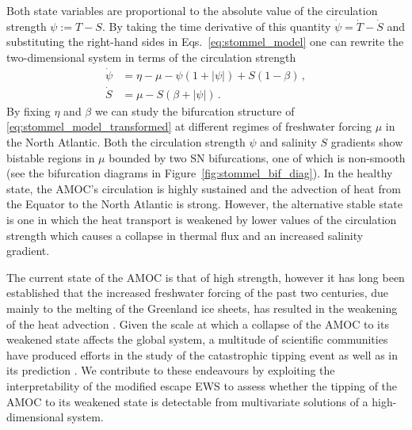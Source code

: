 \documentclass[a4paper,fleqn]{cas-sc}
\newcommand{\fref}[1]{Figure~\ref{#1}}
\begin{document}
Both state variables are proportional to the absolute value of the circulation strength $\psi:=T-S$.
By taking the time derivative of this quantity $\dot{\psi} = \dot{T} - \dot{S}$ and substituting the right-hand sides in Eqs.~\eqref{eq:stommel_model} one can rewrite the two-dimensional system in terms of the circulation strength
%
\begin{equation}
         \begin{aligned}\label{eq:stommel_model_transformed}
                \dot{\psi} &= \eta - \mu -\psi(1+|\psi|) + S(1-\beta)\,,\\
                \dot{S} &= \mu - S(\beta + |\psi|)\,.
        \end{aligned}
\end{equation}
%
By fixing $\eta$ and $\beta$ we can study the bifurcation structure of \eqref{eq:stommel_model_transformed} at different regimes of freshwater forcing $\mu$ in the North Atlantic.
Both the circulation strength $\psi$ and salinity $S$ gradients show bistable regions in $\mu$ bounded by two SN bifurcations, one of which is non-smooth \cite{Budd2024} (see the bifurcation diagrams in \fref{fig:stommel_bif_diag}).
In the healthy state, the AMOC's circulation is highly sustained and the advection of heat from the Equator to the North Atlantic is strong.
However, the alternative stable state is one in which the heat transport is weakened by lower values of the circulation strength which causes a collapse in thermal flux and an increased salinity gradient.

The current state of the AMOC is that of high strength, however it has long been established that the increased freshwater forcing of the past two centuries, due mainly to the melting of the Greenland ice sheets, has resulted in the weakening of the heat advection \cite{Dakos2008,Boers2021b,Lohmann2021}.
Given the scale at which a collapse of the AMOC to its weakened state affects the global system, a multitude of scientific communities have produced efforts in the study of the catastrophic tipping event as well as in its prediction \cite{Boers2021a,vanWesten2024,Mehling2024,Chapman2025,Lohmann2025a,Lohmann2025b,Dijkstra2026}.
We contribute to these endeavours by exploiting the interpretability of the modified escape EWS to assess whether the tipping of the AMOC to its weakened state is detectable from multivariate solutions of a high-dimensional system.
\end{document}
